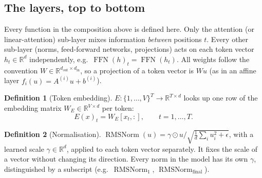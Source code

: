 \documentclass[10pt,a4paper]{article}
\newcommand{\op}[1]{\operatorname{#1}}
\theoremstyle{definition}
\newtheorem{definition}{Definition}[section]
\begin{document}
\subsection{The layers, top to bottom}\label{sec:layers}
Every function in the composition above is defined here. Only the attention (or linear-attention) sub-layer mixes information \emph{between} positions $t$. Every other sub-layer (norms, feed-forward networks, projections) acts on each token vector $h_t\in\mathbb{R}^{d}$ independently, e.g.\ $\op{FFN}(h)_t=\op{FFN}(h_t)$. All weights follow the convention $W\in\mathbb{R}^{d_{\mathrm{out}}\times d_{\mathrm{in}}}$, so a projection of a token vector is $W u$ (as in an affine layer $f_i(u)=A^{(i)}u+b^{(i)}$).
\begin{definition}[Token embedding]\label{def:embed}
$E:\{1,\dots,V\}^{T}\to\mathbb{R}^{T\times d}$ looks up one row of the embedding matrix $W_E\in\mathbb{R}^{V\times d}$ per token:
\begin{equation}
  E(x)_t = W_E[x_t,:],\qquad t=1,\dots,T.
\end{equation}
\end{definition}
\begin{definition}[Normalisation]
$\op{RMSNorm}(u)=\gamma\odot u/\sqrt{\tfrac1d\sum_i u_i^2+\epsilon}$, with a learned scale $\gamma\in\mathbb{R}^{d}$, applied to each token vector separately. It fixes the scale of a vector without changing its direction. Every norm in the model has its own $\gamma$, distinguished by a subscript (e.g.\ $\op{RMSNorm}_1$, $\op{RMSNorm}_{\mathrm{final}}$).
\end{definition}
\end{document}
